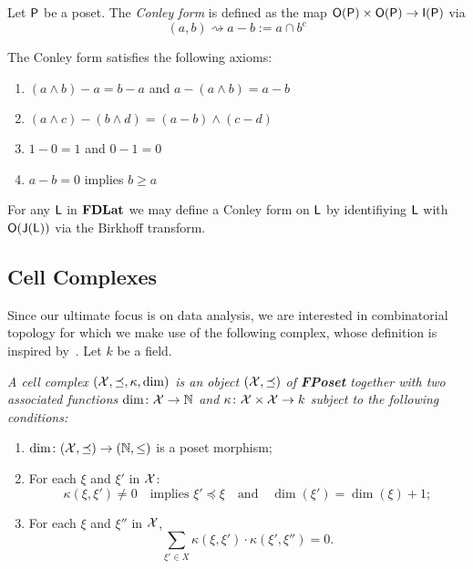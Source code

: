 Let ${\mathsf P}$ be a poset.  The {\em Conley form} is defined as the map ${\mathsf O}({\mathsf P})\times {\mathsf O}({\mathsf P})\to {\mathsf I}({\mathsf P})$ via 
\[
(a,b)\rightsquigarrow a-b:=a\cap b^c
\]

The Conley form satisfies the following axioms:

\begin{enumerate}
\item $(a\wedge b)-a = b-a$ and $a - (a\wedge b) = a-b$
\item $(a\wedge c)-(b\wedge d) = (a-b)\wedge (c-d)$
\item $1-0 = 1$ and $0-1 = 0$
\item $a-b = 0$ implies $b\geq a$
\end{enumerate}

For any ${\mathsf L}$ in ${\bf FDLat}$ we may define a Conley form on ${\mathsf L}$ by identifiying ${\mathsf L}$ with ${\mathsf O}({\mathsf J}({\mathsf L}))$ via the Birkhoff transform.


\subsection{Cell Complexes}

Since our ultimate focus is on data analysis, we are interested in combinatorial topology for which we make use of the following complex, whose definition is inspired by~\cite{lefschetz}.  Let $k$ be a field.

\begin{defn}
\label{defn:cellComplex}
{\em
A {\em cell complex} $({\mathcal X},\preceq,\kappa,\dim)$ is an object $({\mathcal X},\preceq)$ of {\bf FPoset} together with two associated functions $\dim\colon {\mathcal X}\to {\mathbb{N}}$ and $\kappa\colon {\mathcal X}\times {\mathcal X}\to k$ subject to the following conditions:
\begin{enumerate}
\item $\dim\colon({\mathcal X},\preceq)\to ({\mathbb{N}},\leq)$ is a poset morphism;
\item  For each $\xi$ and $\xi'$ in ${\mathcal X}$:
\[
\kappa(\xi,\xi')\neq 0\quad\text{implies } \xi'\preceq \xi \quad\text{and}\quad \dim(\xi') = \dim(\xi)+1;
\]
\item\label{cond:three} For each $\xi$ and $\xi''$ in ${\mathcal X}$,
\[
\sum_{\xi'\in X} \kappa(\xi,\xi')\cdot \kappa(\xi',\xi'')=0.
\]
\end{enumerate}
}
\end{defn}


